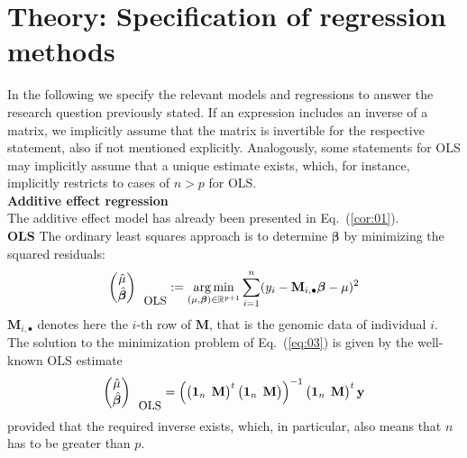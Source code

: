\documentclass{bmcart}
\DeclareMathOperator*{\argmin}{arg\,min}
\newcommand{\M}{\mathbf{M}}
\newcommand{\0}{\mathbf{0}}
\begin{document}
\section*{Theory: Specification of regression methods}
In the following we specify the relevant models and regressions to answer the research question previously stated. 
If an expression includes an inverse of a matrix, we implicitly assume that the matrix is invertible for the respective statement, also if not mentioned explicitly. 
Analogously, some statements for OLS may implicitly assume that a unique estimate exists, which, for instance, implicitly restricts to cases of $n>p$ for OLS. \vspace{0.4cm} \\
{\bf Additive effect regression}\vspace{0.2cm}\\ 
The additive effect model has already been presented in Eq.~(\ref{cor:01}). \vspace{0.1cm}\\
{\bf OLS} 
The ordinary least squares approach is to determine $\bm{\beta}$ by minimizing the squared residuals: 
\begin{equation}\label{eq:03}
	\begin{pmatrix}
		\hat{\mu} \\
		\hat{\bm{\beta}}
	\end{pmatrix}_{\mbox{\small OLS}} := \argmin_{(\mu,\bm{\beta}) \in \mathbb{R}^{p+1}} \sum\limits_{i=1}^n (y_i - \M_{i,\bullet}\bm{\beta} - \mu)^2
\end{equation}
$\M_{i,\bullet}$ denotes here the $i$-th row of $\M$, that is the genomic data of individual $i$. The solution to the minimization problem of Eq.~(\ref{eq:03}) is given by the well-known OLS estimate
\begin{equation}\label{eq:04}
	\begin{pmatrix}
		\hat{\mu} \\
		\hat{\bm{\beta}}
	\end{pmatrix}_{\mbox{\small OLS}} =
	\left( 
	\begin{pmatrix}
		\mathbf{1}_n & \hspace{-0.2cm}\M
	\end{pmatrix}^{t}
	\begin{pmatrix}
		\mathbf{1}_n & \hspace{-0.2cm} \M
	\end{pmatrix} \right)^{-1} 
	\begin{pmatrix}
		\mathbf{1}_n & \hspace{-0.2cm} \M
	\end{pmatrix}^{t}
	\mathbf{y}
\end{equation}
provided that the required inverse exists, which, in particular, also means that $n$ has to be greater than $p$.\\
\end{document}
